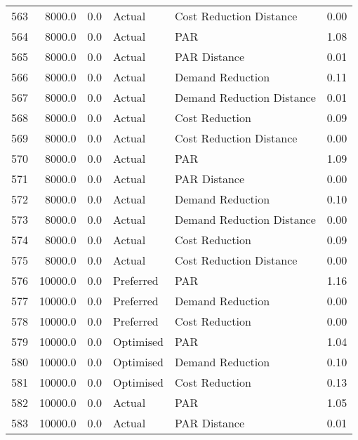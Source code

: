 \begin{longtable}{lrrllr}
563  &       8000.0 &     0.0 &         Actual &    Cost Reduction Distance &   0.00 \\
564  &       8000.0 &     0.0 &         Actual &                        PAR &   1.08 \\
565  &       8000.0 &     0.0 &         Actual &               PAR Distance &   0.01 \\
566  &       8000.0 &     0.0 &         Actual &           Demand Reduction &   0.11 \\
567  &       8000.0 &     0.0 &         Actual &  Demand Reduction Distance &   0.01 \\
568  &       8000.0 &     0.0 &         Actual &             Cost Reduction &   0.09 \\
569  &       8000.0 &     0.0 &         Actual &    Cost Reduction Distance &   0.00 \\
570  &       8000.0 &     0.0 &         Actual &                        PAR &   1.09 \\
571  &       8000.0 &     0.0 &         Actual &               PAR Distance &   0.00 \\
572  &       8000.0 &     0.0 &         Actual &           Demand Reduction &   0.10 \\
573  &       8000.0 &     0.0 &         Actual &  Demand Reduction Distance &   0.00 \\
574  &       8000.0 &     0.0 &         Actual &             Cost Reduction &   0.09 \\
575  &       8000.0 &     0.0 &         Actual &    Cost Reduction Distance &   0.00 \\
576  &      10000.0 &     0.0 &      Preferred &                        PAR &   1.16 \\
577  &      10000.0 &     0.0 &      Preferred &           Demand Reduction &   0.00 \\
578  &      10000.0 &     0.0 &      Preferred &             Cost Reduction &   0.00 \\
579  &      10000.0 &     0.0 &      Optimised &                        PAR &   1.04 \\
580  &      10000.0 &     0.0 &      Optimised &           Demand Reduction &   0.10 \\
581  &      10000.0 &     0.0 &      Optimised &             Cost Reduction &   0.13 \\
582  &      10000.0 &     0.0 &         Actual &                        PAR &   1.05 \\
583  &      10000.0 &     0.0 &         Actual &               PAR Distance &   0.01 \\

\end{longtable}
